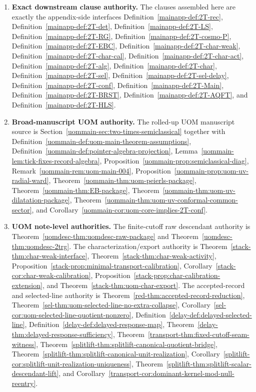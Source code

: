 \documentclass[11pt]{article}
\theoremstyle{definition}
\theoremstyle{plain}
\theoremstyle{remark}
\begin{document}
\begin{enumerate}[leftmargin=2em]
\item \textbf{Exact downstream clause authority.}
  The clauses assembled here are exactly the appendix-side interfaces
  Definition~\ref*{mainapp-def:2T-rec},
  Definition~\ref*{mainapp-def:2T-det},
  Definition~\ref*{mainapp-def:2T-LS},
  Definition~\ref*{mainapp-def:2T-RG},
  Definition~\ref*{mainapp-def:2T-cosmo-P},
  Definition~\ref*{mainapp-def:2T-EBC},
  Definition~\ref*{mainapp-def:2T-char-weak},
  Definition~\ref*{mainapp-def:2T-char-cal},
  Definition~\ref*{mainapp-def:2T-char-act},
  Definition~\ref*{mainapp-def:2T-alg},
  Definition~\ref*{mainapp-def:2T-char},
  Definition~\ref*{mainapp-def:2T-sel},
  Definition~\ref*{mainapp-def:2T-sel-delay},
  Definition~\ref*{mainapp-def:2T-conf},
  Definition~\ref*{mainapp-def:2T-Main},
  Definition~\ref*{mainapp-def:2T-BRST},
  Definition~\ref*{mainapp-def:2T-AQFT}, and
  Definition~\ref*{mainapp-def:2T-HLS}.

\item \textbf{Broad-manuscript UOM authority.}
  The rolled-up UOM manuscript source is
  Section~\ref*{uommain-sec:two-times-semiclassical} together with
  Definition~\ref*{uommain-def:uom-main-theorem-assumptions},
  Definition~\ref*{uommain-def:pointer-algebra-projection},
  Lemma~\ref*{uommain-lem:tick-fixes-record-algebra},
  Proposition~\ref*{uommain-prop:semiclassical-diag},
  Remark~\ref*{uommain-rem:uom-main-004},
  Proposition~\ref*{uommain-prop:uom-uv-radial-ward},
  Theorem~\ref*{uommain-thm:uom-peierls-package},
  Theorem~\ref*{uommain-thm:EB-package},
  Theorem~\ref*{uommain-thm:uom-uv-dilatation-package},
  Theorem~\ref*{uommain-thm:uom-uv-conformal-common-sector}, and
  Corollary~\ref*{uommain-cor:uom-core-implies-2T-conf}.

\item \textbf{UOM note-level authorities.}
  The finite-cutoff raw descendant authority is
  Theorem~\ref*{uomdesc-thm:uomdesc-raw-package} and
  Theorem~\ref*{uomdesc-thm:uomdesc-2trg}.
  The characterization/export authority is
  Theorem~\ref*{stack-thm:char-weak-interface},
  Theorem~\ref*{stack-thm:char-weak-activity},
  Proposition~\ref*{stack-prop:minimal-transport-calibration},
  Corollary~\ref*{stack-cor:char-weak-calibration},
  Proposition~\ref*{stack-prop:char-calibration-extension}, and
  Theorem~\ref*{stack-thm:uom-char-export}.
  The accepted-record and selected-line authority is
  Theorem~\ref*{red-thm:accepted-record-reduction},
  Theorem~\ref*{sel-thm:uom-selected-line-no-extra-collapse},
  Corollary~\ref*{sel-cor:uom-selected-line-quotient-nonzero},
  Definition~\ref*{delay-def:delayed-selected-line},
  Definition~\ref*{delay-def:delayed-response-map},
  Theorem~\ref*{delay-thm:delayed-response-sufficiency},
  Theorem~\ref*{transport-thm:fixed-cutoff-seam-witness},
  Theorem~\ref*{splitlift-thm:splitlift-canonical-quotient-bridge},
  Theorem~\ref*{splitlift-thm:splitlift-canonical-unit-realization},
  Corollary~\ref*{splitlift-cor:splitlift-unit-realization-uniqueness},
  Theorem~\ref*{splitlift-thm:splitlift-scalar-descendant-lift}, and
  Corollary~\ref*{transport-cor:dominant-kernel-mod-null-reentry}.


\end{enumerate}
\end{document}
